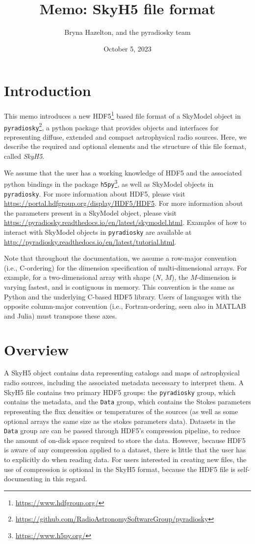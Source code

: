 \documentclass[11pt, oneside]{article}
\title{Memo: SkyH5 file format}
\author{Bryna Hazelton, and the pyradiosky team}
\date{October 5, 2023}
\begin{document}
\maketitle
\tableofcontents
\section{Introduction}
\label{sec:intro}

This memo introduces a new HDF5\footnote{\url{https://www.hdfgroup.org/}} based
file format of a SkyModel object in \texttt{pyradiosky}\footnote{\url{https://github.com/RadioAstronomySoftwareGroup/pyradiosky}},
a python package that provides objects and interfaces for representing diffuse, extended and compact astrophysical radio sources.
Here, we describe the required and optional elements and the structure of this file format, called \textit{SkyH5}.

We assume that the user has a working knowledge of HDF5 and the associated
python bindings in the package \texttt{h5py}\footnote{\url{https://www.h5py.org/}}, as
well as SkyModel objects in \texttt{pyradiosky}. For more information about HDF5, please
visit \url{https://portal.hdfgroup.org/display/HDF5/HDF5}. For more information
about the parameters present in a SkyModel object, please visit
\url{https://pyradiosky.readthedocs.io/en/latest/skymodel.html}.
Examples of how to interact with SkyModel objects in \texttt{pyradiosky} are available at
\url{http://pyradiosky.readthedocs.io/en/latest/tutorial.html}.

Note that throughout the documentation, we assume a row-major convention (i.e.,
C-ordering) for the dimension specification of multi-dimensional arrays. For
example, for a two-dimensional array with shape ($N$, $M$), the $M$-dimension is
varying fastest, and is contiguous in memory. This convention is the same as
Python and the underlying C-based HDF5 library. Users of languages with the
opposite column-major convention (i.e., Fortran-ordering, seen also in MATLAB
and Julia) must transpose these axes.

\section{Overview}
\label{sec:overview}
A SkyH5 object contains data representing catalogs and maps of
astrophysical radio sources, including the associated metadata necessary to interpret them.
A SkyH5 file contains two primary HDF5 groups: the \texttt{pyradiosky} group, which contains the metadata, and
the \texttt{Data} group, which contains the Stokes parameters representing the
flux densities or temperatures of the sources (as well as some optional arrays the same size as the stokes parameters data).
Datasets in the \texttt{Data} group
are can be passed through HDF5's compression
pipeline, to reduce the amount of on-disk space required to store the data.
However, because HDF5 is aware of any compression applied to a dataset, there is
little that the user has to explicitly do when reading data. For users
interested in creating new files, the use of compression is optional in the
SkyH5 format, because the HDF5 file is self-documenting in this regard.
\end{document}
